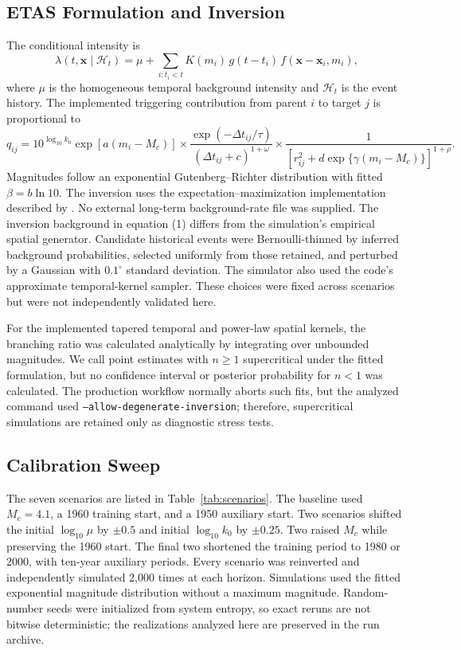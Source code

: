 \documentclass[12pt]{article}
\begin{document}
\subsection*{ETAS Formulation and Inversion}

The conditional intensity is
\begin{equation}
\lambda(t,\mathbf{x}\mid\mathcal{H}_t)=\mu+
\sum_{i:t_i<t} K(m_i)\,g(t-t_i)\,f(\mathbf{x}-\mathbf{x}_i,m_i),
\end{equation}
where $\mu$ is the homogeneous temporal background intensity and
$\mathcal{H}_t$ is the event history. The implemented triggering contribution
from parent $i$ to target $j$ is proportional to
\begin{equation}
q_{ij} =
10^{\log_{10}k_0}\exp[a(m_i-M_c)]
\times
\frac{\exp(-\Delta t_{ij}/\tau)}{(\Delta t_{ij}+c)^{1+\omega}}
\times
\frac{1}{[r_{ij}^2+d\exp\{\gamma(m_i-M_c)\}]^{1+\rho}}.
\end{equation}
Magnitudes follow an exponential Gutenberg--Richter distribution with fitted
$\beta=b\ln 10$. The inversion uses the expectation--maximization implementation
described by \citet{Mizrahi2021a,Mizrahi2021b}. No external long-term
background-rate file was supplied. The inversion background in equation (1)
differs from the simulation's empirical spatial generator. Candidate historical
events were Bernoulli-thinned by inferred background probabilities, selected
uniformly from those retained, and perturbed by a Gaussian with
$0.1^\circ$ standard deviation. The simulator also used the code's approximate
temporal-kernel sampler. These choices were fixed across scenarios but were not
independently validated here.

For the implemented tapered temporal and power-law spatial kernels, the
branching ratio was calculated analytically by integrating over unbounded
magnitudes. We call point estimates with $n\geq1$ supercritical under the
fitted formulation, but no confidence interval or posterior probability for
$n<1$ was calculated. The production workflow
normally aborts such fits, but the analyzed command used
\texttt{--allow-degenerate-inversion}; therefore, supercritical simulations are
retained only as diagnostic stress tests.

\subsection*{Calibration Sweep}

The seven scenarios are listed in Table~\ref{tab:scenarios}. The baseline used
$M_c=4.1$, a 1960 training start, and a 1950 auxiliary start. Two scenarios
shifted the initial $\log_{10}\mu$ by $\pm0.5$ and initial
$\log_{10}k_0$ by $\pm0.25$. Two raised $M_c$ while preserving the 1960 start.
The final two shortened the training period to 1980 or 2000, with ten-year
auxiliary periods. Every scenario was reinverted and independently simulated
2,000 times at each horizon. Simulations used the fitted exponential magnitude
distribution without a maximum magnitude. Random-number seeds were initialized
from system entropy, so exact reruns are not bitwise deterministic; the
realizations analyzed here are preserved in the run archive.
\end{document}
